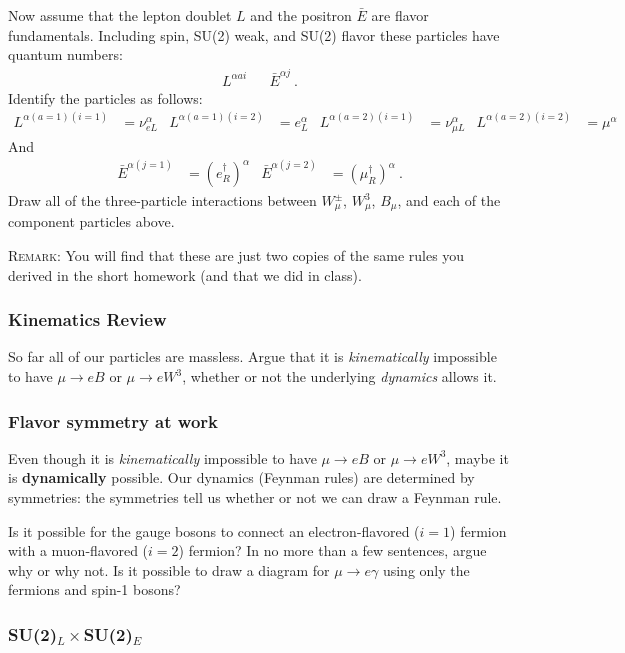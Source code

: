 \documentclass[12pt]{article}
\begin{document}
Now assume that the lepton doublet $L$ and the positron $\bar E$ are flavor fundamentals. Including spin, SU(2) weak, and SU(2) flavor these particles have quantum numbers:
\begin{align}
	L^{\alpha a i} && \bar E^{\alpha j} \ .
\end{align}
Identify the particles as follows:
\begin{align}
	L^{\alpha(a=1)(i=1)} &= \nu_{eL}^\alpha
	&
	L^{\alpha(a=1)(i=2)} &= e_L^\alpha
	&
	L^{\alpha(a=2)(i=1)} &= \nu_{\mu L}^\alpha
	&
	L^{\alpha(a=2)(i=2)} &= \mu^\alpha
\end{align}
And
\begin{align}
	\bar E^{\alpha(j=1)} &= \left(e_R^\dag\right)^\alpha
	&
	\bar E^{\alpha(j=2)} &= \left(\mu_R^\dag\right)^\alpha \ .
\end{align}
Draw all of the three-particle interactions between $W^\pm_\mu$, $W^3_\mu$, $B_\mu$, and each of the component particles above. 

\textsc{Remark}: You will find that these are just two copies of the same rules you derived in the short homework (and that we did in class). 

\subsubsection{Kinematics Review}

So far all of our particles are massless. Argue that it is \emph{kinematically} impossible to have $\mu \to e B$ or $\mu \to e W^3$, whether or not the underlying \emph{dynamics} allows it.

\subsubsection{Flavor symmetry at work}

Even though it is \emph{kinematically} impossible to have $\mu \to e B$ or $\mu \to e W^3$, maybe it is \textbf{dynamically} possible. Our dynamics (Feynman rules) are determined by symmetries: the symmetries tell us whether or not we can draw a Feynman rule.

Is it possible for the gauge bosons to connect an electron-flavored ($i=1$) fermion with a muon-flavored ($i=2$) fermion? In no more than a few sentences, argue why or why not. Is it possible to draw a diagram for $\mu \to e \gamma$ using only the fermions and spin-1 bosons?


\subsubsection{SU(2)$_L\times$SU(2)$_E$}
\end{document}
